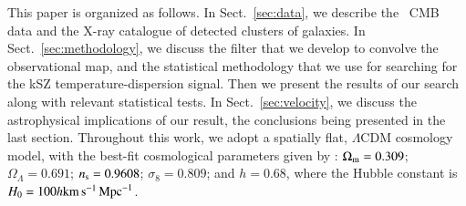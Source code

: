 \documentclass[traditabstract, longauth]{aa}
\newcommand{\1}{\'\i }
\def \kms{{\rm km\,s^{-1}}}
\begin{document}
This paper is organized as follows. In Sect.~\ref{sec:data}, we describe the
\Planck\ CMB data and the X-ray catalogue of detected clusters of galaxies. In
Sect.~\ref{sec:methodology}, we discuss the filter that we develop to convolve
the observational map, and the statistical methodology that we use for
searching for the kSZ temperature-dispersion signal. Then we present the
results of our search along with relevant statistical tests. In
Sect.~\ref{sec:velocity}, we discuss the astrophysical implications of our
result, the conclusions being presented in the last section. Throughout
this work, we adopt a spatially flat, $\Lambda$CDM cosmology model, with the
best-fit cosmological parameters given by \cite{planck2014-a15}: $\Omega_{\rm
m}=0.309$; $\Omega_{\Lambda} = 0.691$; $n_{\rm s} = 0.9608$; $\sigma_{8} =
0.809$; and $h = 0.68$, where the Hubble constant is $H_{0} = 100 h \kms\,{\rm
Mpc}^{-1}$.
\end{document}
